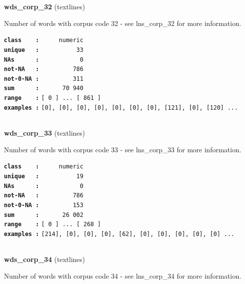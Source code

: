 \documentclass[]{article}
\begin{document}
\textbf{wds\_corp\_32} (textlines)

Number of words with corpus code 32 - see lns\_corp\_32 for more
information.

\textbf{\texttt{class\ \ \ \ :}} \texttt{~~~~~numeric}\\
\textbf{\texttt{unique\ \ \ :}} \texttt{~~~~~~~~~~33}\\
\textbf{\texttt{NAs\ \ \ \ \ \ :}} \texttt{~~~~~~~~~~~0}\\
\textbf{\texttt{not-NA\ \ \ :}} \texttt{~~~~~~~~~786}\\
\textbf{\texttt{not-0-NA\ :}} \texttt{~~~~~~~~~311}\\
\textbf{\texttt{sum\ \ \ \ \ \ :}} \texttt{~~~~~~70~940}\\
\textbf{\texttt{range\ \ \ \ :}}
\texttt{{[}\ 0\ {]}\ ...\ {[}\ 861\ {]}}\\
\textbf{\texttt{examples\ :}}
\texttt{{[}0{]},\ {[}0{]},\ {[}0{]},\ {[}0{]},\ {[}0{]},\ {[}0{]},\ {[}0{]},\ {[}121{]},\ {[}0{]},\ {[}120{]}\ ...}\\

~

\textbf{wds\_corp\_33} (textlines)

Number of words with corpus code 33 - see lns\_corp\_33 for more
information.

\textbf{\texttt{class\ \ \ \ :}} \texttt{~~~~~numeric}\\
\textbf{\texttt{unique\ \ \ :}} \texttt{~~~~~~~~~~19}\\
\textbf{\texttt{NAs\ \ \ \ \ \ :}} \texttt{~~~~~~~~~~~0}\\
\textbf{\texttt{not-NA\ \ \ :}} \texttt{~~~~~~~~~786}\\
\textbf{\texttt{not-0-NA\ :}} \texttt{~~~~~~~~~153}\\
\textbf{\texttt{sum\ \ \ \ \ \ :}} \texttt{~~~~~~26~002}\\
\textbf{\texttt{range\ \ \ \ :}}
\texttt{{[}\ 0\ {]}\ ...\ {[}\ 268\ {]}}\\
\textbf{\texttt{examples\ :}}
\texttt{{[}214{]},\ {[}0{]},\ {[}0{]},\ {[}0{]},\ {[}62{]},\ {[}0{]},\ {[}0{]},\ {[}0{]},\ {[}0{]},\ {[}0{]}\ ...}\\

~

\textbf{wds\_corp\_34} (textlines)

Number of words with corpus code 34 - see lns\_corp\_34 for more
information.
\end{document}
